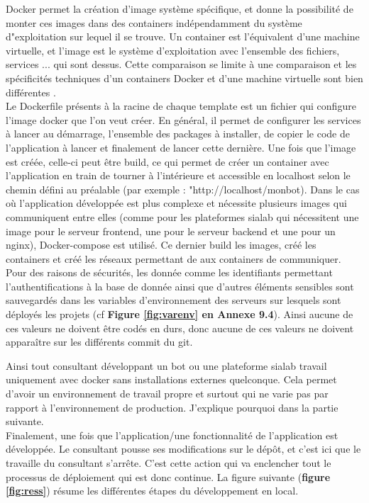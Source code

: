 \documentclass{article} %
\begin{document}
Docker permet la création d'image système spécifique, et donne la possibilité de monter ces images dans des containers indépendamment du système d"exploitation sur lequel il se trouve. Un container est l'équivalent d'une machine virtuelle, et l'image est le système d'exploitation avec l'ensemble des fichiers, services ... qui sont dessus. Cette comparaison se limite à une comparaison et les spécificités techniques d'un containers Docker et d'une machine virtuelle sont bien différentes \cite{comp}.\\

Le Dockerfile présents à la racine de chaque template est un fichier qui configure l'image docker que l'on veut créer. En général, il permet de configurer les services à lancer au démarrage, l'ensemble des packages à installer, de copier le code de l'application à lancer et finalement de lancer cette dernière. Une fois que l'image est créée, celle-ci peut être build, ce qui permet de créer un container avec l'application en train de tourner à l'intérieure et accessible en localhost selon le chemin défini au préalable (par exemple : "http://localhost/monbot). Dans le cas où l'application développée est plus complexe et nécessite plusieurs images qui communiquent entre elles (comme pour les plateformes sialab qui nécessitent une image pour le serveur frontend, une pour le serveur backend et une pour un nginx), Docker-compose est utilisé. Ce dernier  build les images, créé les containers et créé les réseaux permettant de aux containers de communiquer. \\

Pour des raisons de sécurités, les donnée comme les identifiants permettant l'authentifications à la base de donnée ainsi que d'autres éléments sensibles sont sauvegardés dans les variables d'environnement des serveurs sur lesquels sont déployés les projets (cf \textbf{Figure \ref{fig:varenv} en Annexe 9.4}). Ainsi aucune de ces valeurs ne doivent être codés en durs, donc aucune de ces valeurs ne doivent apparaître sur les différents commit du git.

Ainsi tout consultant développant un bot ou une plateforme sialab travail uniquement avec docker sans installations externes quelconque. Cela permet d'avoir un environnement de travail propre et surtout qui ne varie pas par rapport à l'environnement de production. J'explique pourquoi dans la partie suivante.\\

Finalement, une fois que l'application/une fonctionnalité de l'application est développée. Le consultant pousse ses modifications sur le dépôt, et c'est ici que le travaille du consultant s'arrête. C'est cette action qui va enclencher tout le processus de déploiement qui est donc continue. La figure suivante (\textbf{figure \ref{fig:ress}}) résume les différentes étapes du développement en local.
\end{document}
